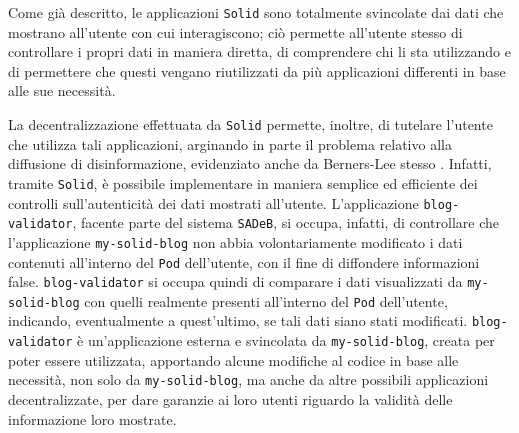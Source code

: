 \medskip

Come già descritto, le applicazioni {\tt Solid} sono totalmente svincolate dai dati che mostrano all'utente con cui interagiscono; ciò permette all'utente stesso di controllare i propri dati in maniera diretta, di comprendere chi li sta utilizzando e di permettere che questi vengano riutilizzati da più applicazioni differenti in base alle sue necessità. 

\medskip

La decentralizzazione effettuata da {\tt Solid} permette, inoltre, di tutelare l'utente che utilizza tali applicazioni, arginando in parte il problema relativo alla diffusione di disinformazione, evidenziato anche da Berners-Lee stesso \cite{worldwideweb}. Infatti, tramite {\tt Solid}, è possibile implementare in maniera semplice ed efficiente dei controlli sull'autenticità dei dati mostrati all'utente. L'applicazione {\tt blog-validator}, facente parte del sistema {\tt SADeB}, si occupa, infatti, di controllare che l'applicazione {\tt my-solid-blog} non abbia volontariamente modificato i dati contenuti all'interno del {\tt Pod} dell'utente, con il fine di diffondere informazioni false. {\tt blog-validator} si occupa quindi di comparare i dati visualizzati da {\tt my-solid-blog} con quelli realmente presenti all'interno del {\tt Pod} dell'utente, indicando, eventualmente a quest'ultimo, se tali dati siano stati modificati. {\tt blog-validator} è un'applicazione esterna e svincolata da {\tt my-solid-blog}, creata per poter essere utilizzata, apportando alcune modifiche al codice in base alle necessità, non solo da {\tt my-solid-blog}, ma anche da altre possibili applicazioni decentralizzate, per dare garanzie ai loro utenti riguardo la validità delle informazione loro mostrate.

\clearpage